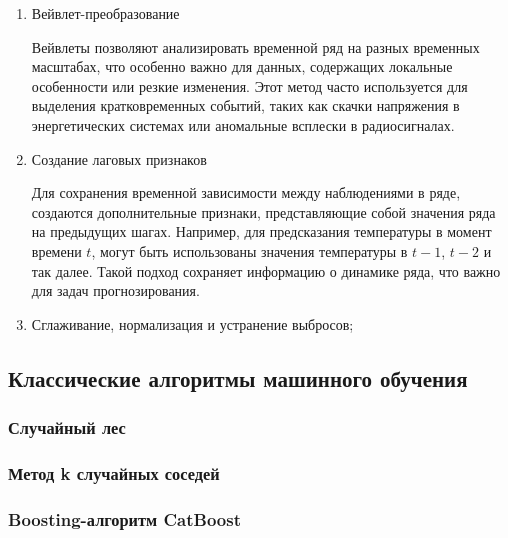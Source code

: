 \documentclass[spec, och, diploma]{SCWorks}
\begin{document}
\begin{enumerate}
                \item Вейвлет-преобразование

                    Вейвлеты позволяют анализировать временной ряд на разных
                    временных масштабах, что особенно важно для данных,
                    содержащих локальные особенности или резкие изменения. Этот
                    метод часто используется для выделения кратковременных
                    событий, таких как скачки напряжения в энергетических
                    системах или аномальные всплески в радиосигналах.

                \item Создание лаговых признаков
                
                    Для сохранения временной зависимости между наблюдениями в
                    ряде, создаются дополнительные признаки, представляющие
                    собой значения ряда на предыдущих шагах. Например, для
                    предсказания температуры в момент времени $t$, могут быть
                    использованы значения температуры в $t-1$, $t-2$ и так
                    далее. Такой подход сохраняет информацию о динамике ряда,
                    что важно для задач прогнозирования.

                \item Сглаживание, нормализация и устранение выбросов;

            \end{enumerate}




    \subsection{Классические алгоритмы машинного обучения}

        \subsubsection{Случайный лес}

        \subsubsection{Метод k случайных соседей}
        
        \subsubsection{Boosting-алгоритм CatBoost}
\end{document}
